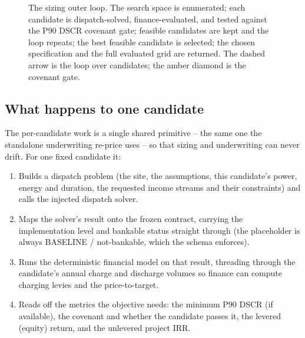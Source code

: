 \begin{figure}[H]
{}
\caption{The sizing outer loop. The search space is enumerated; each candidate is dispatch-solved, finance-evaluated, and tested against the P90 DSCR covenant gate; feasible candidates are kept and the loop repeats; the best feasible candidate is selected; the chosen specification and the full evaluated grid are returned. The dashed arrow is the loop over candidates; the amber diamond is the covenant gate.}
\label{fig:sizingloop}
\end{figure}

\subsection{What happens to one candidate}

The per-candidate work is a single shared primitive -- the same one the standalone underwriting re-price uses -- so that sizing and underwriting can never drift. For one fixed candidate it:

\begin{enumerate}
  \item Builds a dispatch problem (the site, the assumptions, this candidate's power, energy and duration, the requested income streams and their constraints) and calls the injected dispatch solver.
  \item Maps the solver's result onto the frozen  contract, carrying the implementation level and bankable status straight through (the placeholder is always BASELINE / not-bankable, which the schema enforces).
  \item Runs the deterministic financial model on that result, threading through the candidate's annual charge and discharge volumes so finance can compute charging levies and the price-to-target.
  \item Reads off the metrics the objective needs: the minimum P90 DSCR (if available), the covenant and whether the candidate passes it, the levered (equity) return, and the unlevered project IRR.
\end{enumerate}

